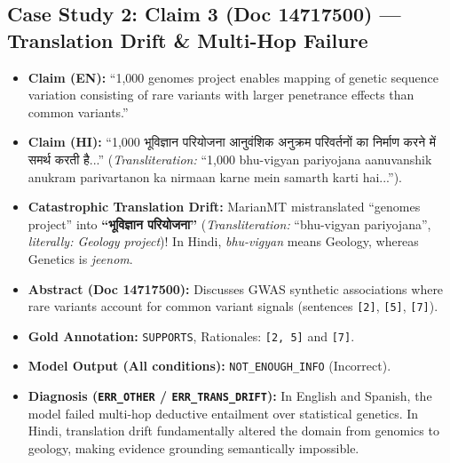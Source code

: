 \documentclass[10pt,twocolumn]{article}
\begin{document}
\subsection{Case Study 2: Claim 3 (Doc 14717500) — Translation Drift & Multi-Hop Failure}
\begin{itemize}
    \item \textbf{Claim (EN):} ``1,000 genomes project enables mapping of genetic sequence variation consisting of rare variants with larger penetrance effects than common variants.''
    \item \textbf{Claim (HI):} ``1,000 भूविज्ञान परियोजना आनुवंशिक अनुक्रम परिवर्तनों का निर्माण करने में समर्थ करती है...'' (\textit{Transliteration:} ``1,000 bhu-vigyan pariyojana aanuvanshik anukram parivartanon ka nirmaan karne mein samarth karti hai...'').
    \item \textbf{Catastrophic Translation Drift:} MarianMT mistranslated ``genomes project'' into \textbf{``भूविज्ञान परियोजना''} (\textit{Transliteration:} ``bhu-vigyan pariyojana'', \textit{literally: Geology project})! In Hindi, \textit{bhu-vigyan} means Geology, whereas Genetics is \textit{jeenom}.
    \item \textbf{Abstract (Doc 14717500):} Discusses GWAS synthetic associations where rare variants account for common variant signals (sentences \texttt{[2]}, \texttt{[5]}, \texttt{[7]}).
    \item \textbf{Gold Annotation:} \texttt{SUPPORTS}, Rationales: \texttt{[2, 5]} and \texttt{[7]}.
    \item \textbf{Model Output (All conditions):} \texttt{NOT\_ENOUGH\_INFO} (Incorrect).
    \item \textbf{Diagnosis (\texttt{ERR_OTHER} / \texttt{ERR_TRANS_DRIFT}):} In English and Spanish, the model failed multi-hop deductive entailment over statistical genetics. In Hindi, translation drift fundamentally altered the domain from genomics to geology, making evidence grounding semantically impossible.
\end{itemize}
\end{document}
